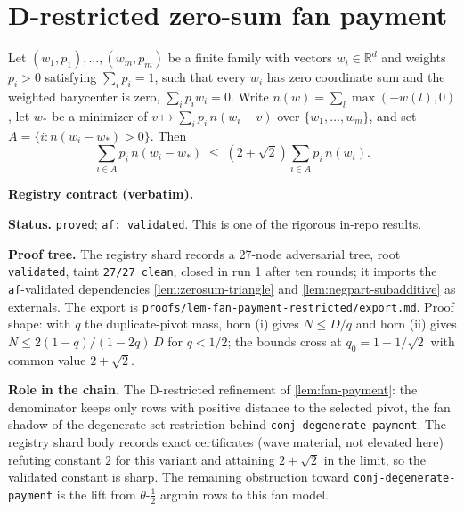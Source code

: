 \section{D-restricted zero-sum fan payment}\label{sec:fan-payment-restricted}

\begin{lemma}\label{lem:fan-payment-restricted}
Let $(w_1,p_1),\dots,(w_m,p_m)$ be a finite family with vectors
$w_i\in\mathbb{R}^d$ and weights $p_i>0$ satisfying $\sum_i p_i=1$, such that
every $w_i$ has zero coordinate sum and the weighted barycenter is zero,
$\sum_i p_i w_i=0$. Write $n(w)=\sum_l\max(-w(l),0)$, let $w_{*}$ be a minimizer
of $v\mapsto\sum_i p_i\,n(w_i-v)$ over $\{w_1,\dots,w_m\}$, and set
$A=\{i:n(w_i-w_{*})>0\}$. Then
\[
  \sum_{i\in A}p_i\,n(w_i-w_{*})\;\le\;(2+\sqrt2)\sum_{i\in A}p_i\,n(w_i).
\]
\end{lemma}

\noindent\textbf{Registry contract (verbatim).}

\noindent\textbf{Status.} \texttt{proved}; \texttt{af: validated}.
This is one of the rigorous in-repo results.

\noindent\textbf{Proof tree.} The registry shard records a 27-node
adversarial tree, root \texttt{validated}, taint \texttt{27/27 clean},
closed in run 1 after ten rounds; it imports the \texttt{af}-validated
dependencies \ref{lem:zerosum-triangle} and
\ref{lem:negpart-subadditive} as externals.  The export is
\texttt{proofs/lem-fan-payment-restricted/export.md}.  Proof shape:
with $q$ the duplicate-pivot mass, horn (i) gives $N \le D/q$ and horn
(ii) gives $N \le 2(1-q)/(1-2q)\,D$ for $q < 1/2$; the bounds cross at
$q_0 = 1 - 1/\sqrt{2}$ with common value $2 + \sqrt{2}$.

\noindent\textbf{Role in the chain.} The D-restricted refinement of
\ref{lem:fan-payment}: the denominator keeps only rows with positive
distance to the selected pivot, the fan shadow of the degenerate-set
restriction behind \texttt{conj-degenerate-payment}.  The registry
shard body records exact certificates (wave material, not elevated
here) refuting constant $2$ for this variant and attaining
$2 + \sqrt{2}$ in the limit, so the validated constant is sharp.  The
remaining obstruction toward \texttt{conj-degenerate-payment} is the
lift from $\theta$-$\tfrac12$ argmin rows to this fan model.
